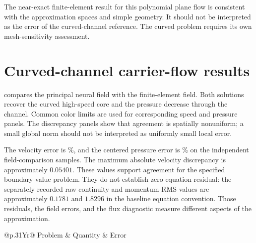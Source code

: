 The near-exact finite-element result for this polynomial plane flow is
consistent with the approximation spaces and simple geometry. It should
not be interpreted as the error of the curved-channel reference. The
curved problem requires its own mesh-sensitivity assessment.


\section{Curved-channel carrier-flow results}
 compares the principal neural field with the
finite-element field. Both solutions recover the curved high-speed core
and the pressure decrease through the channel. Common color limits are
used for corresponding speed and pressure panels. The discrepancy panels
show that agreement is spatially nonuniform; a small global norm should
not be interpreted as uniformly small local error.

The velocity error is \FlowVelocity\%, and the centered pressure error is
\FlowPressure\% on the independent field-comparison samples. The maximum
absolute velocity discrepancy is approximately $0.05401$. These values
support agreement for the specified boundary-value problem. They do not
establish zero equation residual: the separately recorded raw continuity
and momentum RMS values are approximately $0.1781$ and $1.8296$ in the
baseline equation convention. Those residuals, the field errors, and the
flux diagnostic measure different aspects of the approximation.


\begin{table}[htbp]\centering\small
\caption{Supported baseline numerical comparisons. The relative errors
refer to their stated sample sets and normalizations.}
\label{tab:basic_errors}
\begin{tabularx}{\textwidth}{@{}p{}Yr@{}}\toprule
Problem & Quantity & Error\\\midrule
{}
\bottomrule\end{tabularx}
\end{table}

